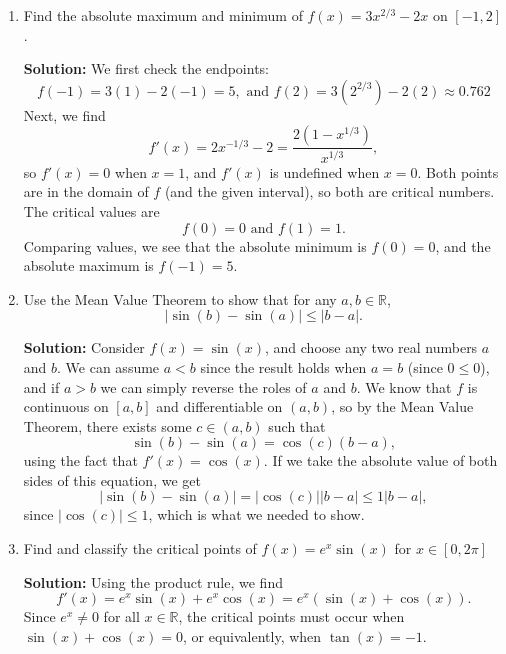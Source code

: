 \documentclass[12pt]{article}
\newcommand{\points}[1]{\marginpar{\hspace{24pt}[#1]}}
\newcommand{\abs}[1]{\lvert #1\rvert}
\newcommand{\R}{\mathbb{R}}
\begin{document}
\author{Instructor: Sean Fitzpatrick}




\begin{enumerate}
  \item Find the absolute maximum and minimum of $f(x)=3x^{2/3}-2x$ on $[-1,2]$. \points{4} 
 
 
 
\medskip

\textbf{Solution:} We first check the endpoints:
\[
f(-1) = 3(1)-2(-1)=5, \text{ and } f(2) = 3(2^{2/3})-2(2) \approx 0.762
\]
Next, we find
\[
f'(x) = 2x^{-1/3}-2 = \frac{2(1-x^{1/3})}{x^{1/3}},
\]
so $f'(x)=0$ when $x=1$, and $f'(x)$ is undefined when $x=0$. Both points are in the domain of $f$ (and the given interval), so both are critical numbers. The critical values are
\[
f(0) = 0 \text{ and } f(1) = 1.
\]
Comparing values, we see that the absolute minimum is $f(0)=0$, and the absolute maximum is $f(-1)=5$.
 
 \medskip
  
 \item Use the Mean Value Theorem to show that for any $a,b\in\R$,\points{2}
 \[
 \abs{\sin(b)-\sin(a)}\leq \abs{b-a}.
 \]
 

 \medskip
 
\textbf{Solution:} Consider $f(x)=\sin(x)$, and choose any two real numbers $a$ and $b$. We can assume $a<b$ since the result holds when $a=b$ (since $0\leq 0$), and if $a>b$ we can simply reverse the roles of $a$ and $b$. We know that $f$ is continuous on $[a,b]$ and differentiable on $(a,b)$, so by the Mean Value Theorem, there exists some $c\in (a,b)$ such that 
 \[
 \sin(b)-\sin(a)=\cos(c)(b-a),
 \]
 using the fact that $f'(x)=\cos(x)$. If we take the absolute value of both sides of this equation, we get
 \[
 \abs{\sin(b)-\sin(a)}=\abs{\cos(c)}\abs{b-a} \leq 1\abs{b-a},
 \]
 since $\abs{\cos(c)}\leq 1$, which is what we needed to show.
 
 \medskip
 
 \item Find and classify the critical points of $f(x)=e^x\sin(x)$ for $x\in [0,2\pi]$\points{4}
 
 \medskip
 
 \textbf{Solution:} Using the product rule, we find
 \[
 f'(x) = e^x\sin(x)+e^x\cos(x)=e^x(\sin(x)+\cos(x)).
 \]
 Since $e^x\neq 0$ for all $x\in \R$, the critical points must occur when $\sin(x)+\cos(x)=0$, or equivalently, when $\tan(x)=-1$.


\end{enumerate}
\end{document}
